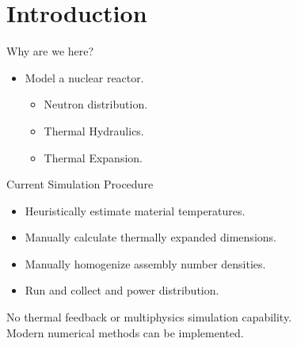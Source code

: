 \section{Introduction}
\label{sec:introduction}

\begin{frame}{Why are we here?}
  \pause
  \begin{itemize}
    \item {\huge Model a nuclear reactor.}
      \pause
      \begin{itemize}
        \item Neutron distribution.
        \item Thermal Hydraulics.
        \item Thermal Expansion.
      \end{itemize}
  \end{itemize}
\end{frame}

\begin{frame}{Current Simulation Procedure}
  \begin{itemize}
    \item Heuristically estimate material temperatures.
    \item Manually calculate thermally expanded dimensions.
    \item Manually homogenize assembly number densities.
    \item Run \dif and collect \keff and power distribution.
    \pause
  \end{itemize}
  \vspace{0.3in}
  \begin{block}{}
    \centering
    No thermal feedback or multiphysics simulation capability.\\
    Modern numerical methods can be implemented.
  \end{block}
\end{frame}

